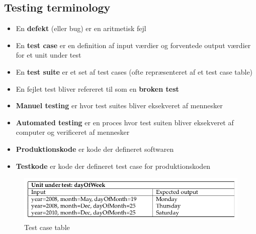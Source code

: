 \documentclass[a4, english]{article}
\begin{document}
\subsection{Testing terminology}
\begin{itemize}
  \item En \textbf{defekt} (eller bug) er en aritmetisk fejl
  \item En \textbf{test case} er en definition af input værdier og forventede output værdier for et unit under test
  \item En \textbf{test suite} er et set af test cases (ofte repræsenteret af et test case table)
  \item En fejlet test bliver refereret til som en \textbf{broken test}
  \item \textbf{Manuel testing} er hvor test suites bliver eksekveret af mennesker 
  \item \textbf{Automated testing} er en proces hvor test suiten bliver eksekveret af computer og verificeret af mennesker
  \item \textbf{Produktionskode} er kode der defineret softwaren
  \item \textbf{Testkode} er kode der defineret test case for produktionskoden
\end{itemize} 
\begin{figure}[H]
	\centering
	\includegraphics[width=\linewidth]{img/test_case_table_tdd}
	\caption{Test case table	\label{testCaseTableTDDc}}
\end{figure}
\newpage
\end{document}
